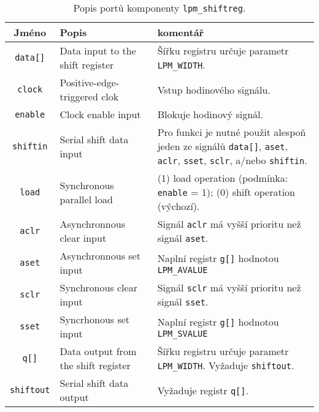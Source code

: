     \begin{table*} 
      \centering
      \begin{tabular}{|c|p{3.5cm}|p{8cm}|}
        \hline
           \rowcolor{CornflowerBlue} {\textbf{Jméno}} & {\textbf{Popis}} & {\textbf{komentář}} \\
        \hline\hline       
           \texttt{data[]}   & Data input to the shift register    
                             & Šířku registru určuje parametr \texttt{LPM\_WIDTH}. \\
        \hline   
           \texttt{clock}    & Positive-edge-triggered clok        
                             & Vstup hodinového signálu. \\
        \hline     
           \texttt{enable}   & Clock enable input                  
                             & Blokuje hodinový signál. \\
        \hline      
           \texttt{shiftin}  & Serial shift data input             
                             & Pro funkci je nutné použit alespoň jeden ze signálů
                               \texttt{data[]}, \texttt{aset}, \texttt{aclr}, \texttt{sset}, 
                               \texttt{sclr}, a/nebo \texttt{shiftin}.  \\
        \hline    
           \texttt{load}     & Synchronous parallel load           
                             & (1) load operation (podmínka: \texttt{enable} = 1); (0) shift
                               operation (výchozí). \\
        \hline    
           \texttt{aclr}     & Asynchronnous clear input          
                             & Signál \texttt{aclr} má vyšší prioritu než signál
           \texttt{aset}.  \\
        \hline    
           \texttt{aset}     & Asynchronnous set input             
                             & Naplní registr \texttt{g[]} hodnotou \texttt{LPM\_AVALUE} \\
        \hline 
           \texttt{sclr}     & Synchronous clear input             
                             & Signál \texttt{sclr} má vyšší prioritu než signál
           \texttt{sset}.  \\
        \hline  
           \texttt{sset}     & Syncrhonous set input              
                             & Naplní registr \texttt{g[]} hodnotou \texttt{LPM\_SVALUE} \\
        \hline  
           \texttt{q[]}      & Data output from the shift register 
                             & Šířku registru určuje parametr \texttt{LPM\_WIDTH}. Vyžaduje
           \texttt{shiftout}.  \\
        \hline 
           \texttt{shiftout} & Serial shift data output          
                             & Vyžaduje registr \texttt{q[]}. \\
        \hline                                                           
      \end{tabular}
      \caption{Popis portů komponenty \texttt{lpm\_shiftreg}.}
      \label{VHDL:tab_lpm_shiftreg}       
    \end{table*}
    
